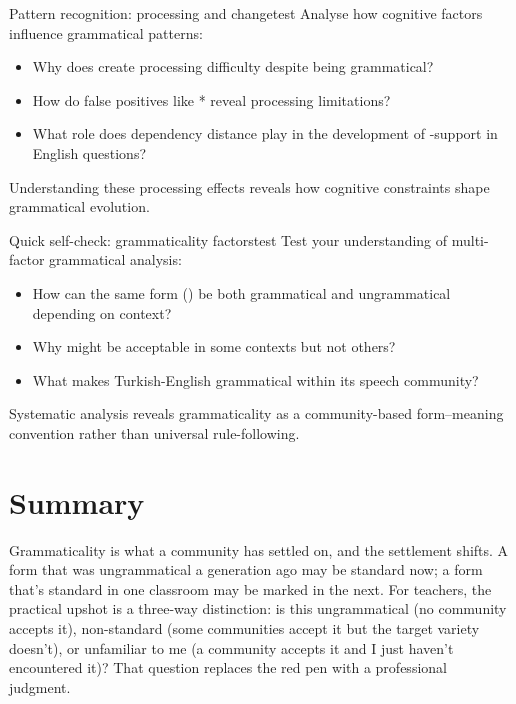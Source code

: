 \begin{tblsframedsymbol}{Pattern recognition: processing and change}{test}
Analyse how cognitive factors influence grammatical patterns:
\begin{itemize}[noitemsep, leftmargin=*]
    \item Why does  create processing difficulty despite being grammatical?
    \item How do false positives like * reveal processing limitations?
    \item What role does dependency distance play in the development of -support in English questions?
\end{itemize}
Understanding these processing effects reveals how cognitive constraints shape grammatical evolution.
\end{tblsframedsymbol}

\begin{tblsframedsymbol}{Quick self-check: grammaticality factors}{test}
Test your understanding of multi-factor grammatical analysis:
\begin{itemize}[noitemsep, leftmargin=*]
    \item How can the same form () be both grammatical and ungrammatical depending on context?
    \item Why might  be acceptable in some contexts but not others?
    \item What makes Turkish-English  grammatical within its speech community?
\end{itemize}
Systematic analysis reveals grammaticality as a community-based form--meaning convention rather than universal rule-following.
\end{tblsframedsymbol}


\section{Summary}

Grammaticality is what a community has settled on, and the settlement shifts. A form that was ungrammatical a generation ago may be standard now; a form that's standard in one classroom may be marked in the next. For teachers, the practical upshot is a three-way distinction: is this ungrammatical (no community accepts it), non-standard (some communities accept it but the target variety doesn't), or unfamiliar to me (a community accepts it and I just haven't encountered it)? That question replaces the red pen with a professional judgment.
